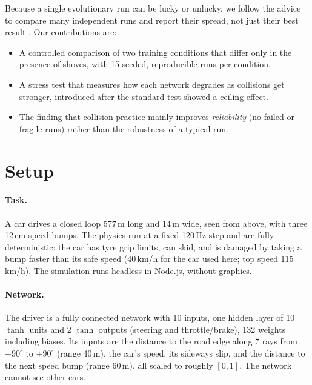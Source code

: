 \documentclass[11pt,a4paper]{article}
\begin{document}
Because a single evolutionary run can be lucky or unlucky, we follow the advice to compare many independent runs and report their spread, not just their best result \cite{henderson2018matters,agarwal2021precipice}. Our contributions are:
\begin{itemize}
  \item A controlled comparison of two training conditions that differ only in the presence of shoves, with 15 seeded, reproducible runs per condition.
  \item A stress test that measures how each network degrades as collisions get stronger, introduced after the standard test showed a ceiling effect.
  \item The finding that collision practice mainly improves \emph{reliability} (no failed or fragile runs) rather than the robustness of a typical run.
\end{itemize}

\section{Setup}
\paragraph{Task.} A car drives a closed loop 577\,m long and 14\,m wide, seen from above, with three 12\,cm speed bumps. The physics run at a fixed 120\,Hz step and are fully deterministic: the car has tyre grip limits, can skid, and is damaged by taking a bump faster than its safe speed (40\,km/h for the car used here; top speed 115\,km/h). The simulation runs headless in Node.js, without graphics.

\paragraph{Network.} The driver is a fully connected network with 10 inputs, one hidden layer of 10 $\tanh$ units and 2 $\tanh$ outputs (steering and throttle/brake), 132 weights including biases. Its inputs are the distance to the road edge along 7 rays from $-90^\circ$ to $+90^\circ$ (range 40\,m), the car's speed, its sideways slip, and the distance to the next speed bump (range 60\,m), all scaled to roughly $[0,1]$. The network cannot see other cars.
\end{document}
